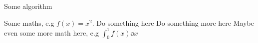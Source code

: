 \documentclass[english,notitlepage]{revtex4-1}  %
\begin{document}
\begin{algorithm}[H]
    \caption{Some algorithm}\label{algo:midpoint_rule}
    \begin{algorithmic}
        \State Some maths, e.g $f(x) = x^2$.  
        \State Do something here 
        \EndFor
        \State Do something more here 
        \EndWhile
        \State Maybe even some more math here, e.g $\int_0^1 f(x) \dd x$
    \end{algorithmic}
\end{algorithm}
   
\end{document}
